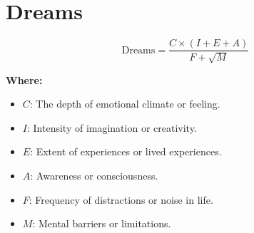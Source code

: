 \chapter{Dreams}

\begin{equation}
\text{Dreams} = \frac{C \times (I + E + A)}{F + \sqrt{M}}
\end{equation}

\textbf{Where:}

\begin{itemize}
    \item $C$: The depth of emotional climate or feeling.
    \item $I$: Intensity of imagination or creativity.
    \item $E$: Extent of experiences or lived experiences.
    \item $A$: Awareness or consciousness.
    \item $F$: Frequency of distractions or noise in life.
    \item $M$: Mental barriers or limitations.
\end{itemize}
